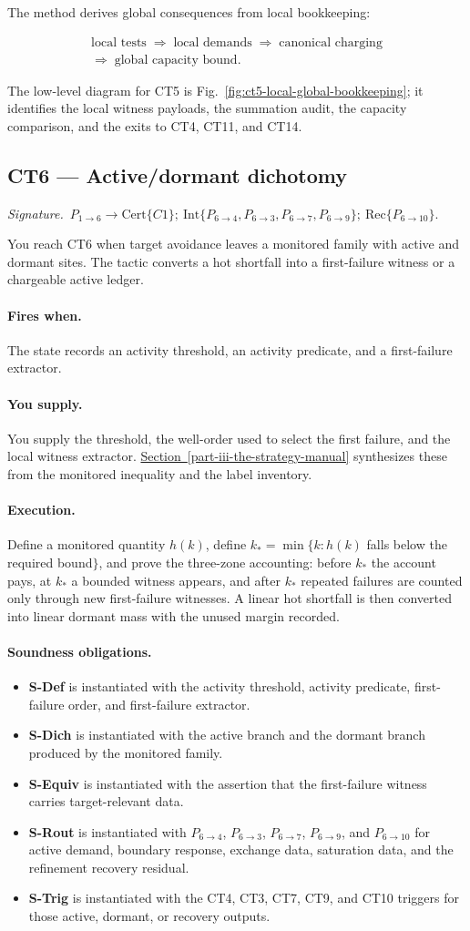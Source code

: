 \documentclass[
  11pt,
]{article}
\providecommand{\tightlist}{%
  \setlength{\itemsep}{0pt}\setlength{\parskip}{0pt}}
\theoremstyle{definition}
\newcommand{\secref}[1]{\hyperref[#1]{Section~\ref*{#1}}}
\newcommand{\ctsignature}[1]{\par\noindent\emph{Signature.}\ #1\par\medskip}
\newcommand{\ctcert}[1]{\mathrm{Cert}\{#1\}}
\newcommand{\ctint}[1]{\mathrm{Int}\{#1\}}
\newcommand{\ctrec}[1]{\mathrm{Rec}\{#1\}}
\newcommand{\ctpar}[1]{\paragraph{#1.}}
\begin{document}
The method derives global consequences from local bookkeeping:

\[
\begin{gathered}
\text{local tests}
\;\Rightarrow\;
\text{local demands}
\;\Rightarrow\;
\text{canonical charging}\\
\Rightarrow\;
\text{global capacity bound}.
\end{gathered}
\]

The low-level diagram for CT5 is Fig.~\ref{fig:ct5-local-global-bookkeeping};
it identifies the local witness payloads, the summation audit, the
capacity comparison, and the exits to CT4, CT11, and CT14.



\subsection{CT6 --- Active/dormant dichotomy}\label{ct:6}\label{the-activedormant-dichotomy}
\ctsignature{\(P_{1\to6}\to \ctcert{C1};\ \ctint{P_{6\to4},P_{6\to3},P_{6\to7},P_{6\to9}};\ \ctrec{P_{6\to10}}\).}

You reach CT6 when target avoidance leaves a monitored family with
active and dormant sites.  The tactic converts a hot shortfall into a
first-failure witness or a chargeable active ledger.

\ctpar{Fires when}
The state records an activity threshold, an activity predicate, and a
first-failure extractor.

\ctpar{You supply}
You supply the threshold, the well-order used to select the first
failure, and the local witness extractor.  \secref{part-iii-the-strategy-manual} synthesizes these
from the monitored inequality and the label inventory.

\ctpar{Execution}
Define a monitored quantity \(h(k)\), define
\(k_*=\min\{k:h(k)\) falls below the required bound\(\}\), and prove the
three-zone accounting: before \(k_*\) the account pays, at \(k_*\) a
bounded witness appears, and after \(k_*\) repeated failures are counted
only through new first-failure witnesses.  A linear hot shortfall is then
converted into linear dormant mass with the unused margin recorded.

\ctpar{Soundness obligations}
\begin{itemize}
\tightlist
\item \textbf{S-Def} is instantiated with the activity threshold, activity predicate, first-failure order, and first-failure extractor.
\item \textbf{S-Dich} is instantiated with the active branch and the dormant branch produced by the monitored family.
\item \textbf{S-Equiv} is instantiated with the assertion that the first-failure witness carries target-relevant data.
\item \textbf{S-Rout} is instantiated with \(P_{6\to4}\), \(P_{6\to3}\), \(P_{6\to7}\), \(P_{6\to9}\), and \(P_{6\to10}\) for active demand, boundary response, exchange data, saturation data, and the refinement recovery residual.
\item \textbf{S-Trig} is instantiated with the CT4, CT3, CT7, CT9, and CT10 triggers for those active, dormant, or recovery outputs.
\end{itemize}
\end{document}
